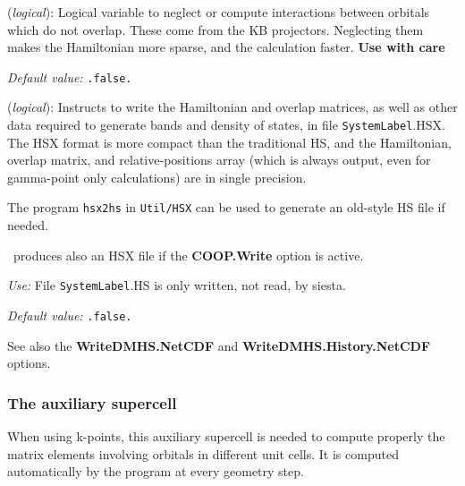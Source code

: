 \begin{description}
\itemsep 10pt
\parsep 0pt

\item[\textbf{NeglNonOverlapInt}] (\textit{logical}):
Logical variable to neglect or compute interactions between orbitals
which do not overlap. These come from the KB projectors.
Neglecting them makes the Hamiltonian more sparse, and
the calculation faster.  \textbf{Use with care}

\textit{Default value:} \texttt{.false.}

\item[\textbf{SaveHS}] (\textit{logical}):
Instructs to write the Hamiltonian and overlap matrices, as well
as other data required to generate bands and density of states,
in file \texttt{SystemLabel}.HSX. The HSX format is more
compact than the traditional HS, and the Hamiltonian,
overlap matrix, and relative-positions array (which is always output,
even for gamma-point only calculations) are in single precision.

The program \texttt{hsx2hs} in \texttt{Util/HSX} can be used to generate
an old-style HS file if needed.

\siesta\ produces also an HSX file if the \textbf{COOP.Write} option
is active.

\textit{Use:} File \texttt{SystemLabel}.HS is only written, not read, by siesta.

\textit{Default value:} \texttt{.false.}

See also the \textbf{WriteDMHS.NetCDF} and \textbf{WriteDMHS.History.NetCDF}
options.
\end{description}

\subsubsection{The auxiliary supercell}

When using k-points, this auxiliary supercell is needed to compute properly
the matrix elements involving orbitals in different unit cells.
It is computed automatically by the program at every geometry step.

